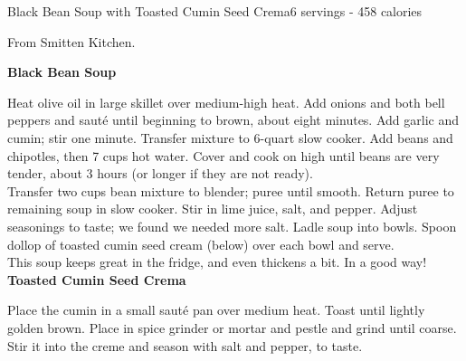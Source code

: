 \begin{recipe}{Black Bean Soup with Toasted Cumin Seed Crema}{6 servings - 458 calories}{}

\freeform From Smitten Kitchen.


\textbf{Black Bean Soup}

Heat olive oil in large skillet over medium-high heat. Add onions and both bell peppers and sauté until beginning to brown, about eight minutes. Add garlic and cumin; stir one minute. Transfer mixture to 6-quart slow cooker. Add beans and chipotles, then 7 cups hot water. Cover and cook on high until beans are very tender, about 3 hours (or longer if they are not ready).\\

Transfer two cups bean mixture to blender; puree until smooth. Return puree to remaining soup in slow cooker. Stir in lime juice, salt, and pepper. Adjust seasonings to taste; we found we needed more salt. Ladle soup into bowls. Spoon dollop of toasted cumin seed cream (below) over each bowl and serve.\\

This soup keeps great in the fridge, and even thickens a bit. In a good way!\\

\textbf{Toasted Cumin Seed Crema}

Place the cumin in a small sauté pan over medium heat. Toast until lightly golden brown. Place in spice grinder or mortar and pestle and grind until coarse. Stir it into the creme and season with salt and pepper, to taste.

\end{recipe}